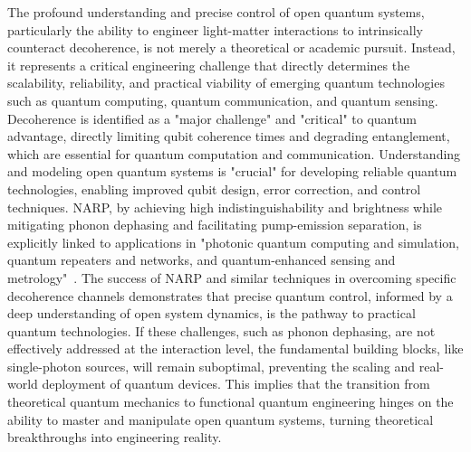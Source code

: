 \documentclass{article}
\begin{document}
The profound understanding and precise control of open quantum systems, particularly the ability to engineer light-matter interactions to intrinsically counteract decoherence, is not merely a theoretical or academic pursuit. Instead, it represents a critical engineering challenge that directly determines the scalability, reliability, and practical viability of emerging quantum technologies such as quantum computing, quantum communication, and quantum sensing. Decoherence is identified as a "major challenge" and "critical" to quantum advantage, directly limiting qubit coherence times and degrading entanglement, which are essential for quantum computation and communication. Understanding and modeling open quantum systems is "crucial" for developing reliable quantum technologies, enabling improved qubit design, error correction, and control techniques. NARP, by achieving high indistinguishability and brightness while mitigating phonon dephasing and facilitating pump-emission separation, is explicitly linked to applications in "photonic quantum computing and simulation, quantum repeaters and networks, and quantum-enhanced sensing and metrology"~\cite{Wilbur2022NotchfilteredAR}. The success of NARP and similar techniques in overcoming specific decoherence channels demonstrates that precise quantum control, informed by a deep understanding of open system dynamics, is the pathway to practical quantum technologies. If these challenges, such as phonon dephasing, are not effectively addressed at the interaction level, the fundamental building blocks, like single-photon sources, will remain suboptimal, preventing the scaling and real-world deployment of quantum devices. This implies that the transition from theoretical quantum mechanics to functional quantum engineering hinges on the ability to master and manipulate open quantum systems, turning theoretical breakthroughs into engineering reality.
\end{document}
